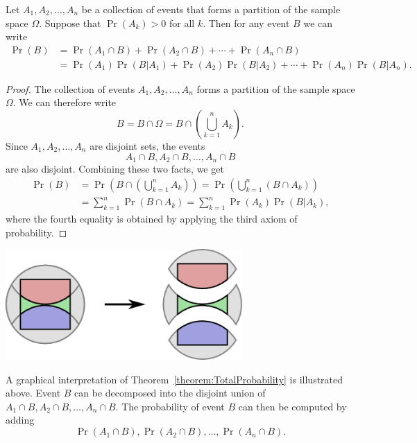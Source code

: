 \begin{theorem} \label{theorem:TotalProbability}
Let $A_1, A_2, \ldots, A_n$ be a collection of events that forms a partition of the sample space $\Omega$.
Suppose that $\Pr (A_k) > 0$ for all $k$.
Then for any event $B$ we can write
\begin{equation*}
\begin{split}
\Pr (B) &= \Pr (A_1 \cap B) + \Pr (A_2 \cap B) + \cdots + \Pr (A_n \cap B) \\
&= \Pr (A_1) \Pr (B | A_1) + \Pr (A_2) \Pr (B | A_2) + \cdots + \Pr (A_n) \Pr (B | A_n ) .
\end{split}
\end{equation*}
\end{theorem}
\begin{proof}
The collection of events $A_1, A_2, \ldots, A_n$ forms a partition of the sample space $\Omega$.
We can therefore write
\begin{equation*}
B = B \cap \Omega = B \cap \left( \bigcup_{k=1}^n A_k \right) .
\end{equation*}
Since $A_1, A_2, \ldots, A_n$ are disjoint sets, the events
\begin{equation*}
A_1 \cap B, A_2 \cap B, \ldots, A_n \cap B
\end{equation*}
are also disjoint.
Combining these two facts, we get
\begin{equation*}
\begin{split}
\Pr (B)
&= \Pr \left( B \cap \left( \bigcup_{k=1}^n A_k \right) \right)
= \Pr \left( \bigcup_{k=1}^n (B \cap A_k) \right) \\
&= \sum_{k=1}^n \Pr \left( B \cap A_k \right)
= \sum_{k=1}^n \Pr (A_k) \Pr \left( B |A_k \right) ,
\end{split}
\end{equation*}
where the fourth equality is obtained by applying the third axiom of probability.
\end{proof}

\begin{center}
\includegraphics[height=4.23cm]{Figures/3Chapter/setpartition3}
\end{center}
A graphical interpretation of Theorem~\ref{theorem:TotalProbability} is illustrated above.
Event $B$ can be decomposed into the disjoint union of $A_1 \cap B, A_2 \cap B, \ldots, A_n \cap B$.
The probability of event $B$ can then be computed by adding
\begin{equation*}
\Pr (A_1 \cap B), \Pr (A_2 \cap B), \ldots, \Pr (A_n \cap B) .
\end{equation*}

